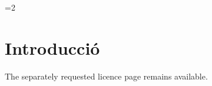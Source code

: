 \documentclass[CAT,TFG,no-cover,no-toc]{P3CTeX}
\begin{document}
\pxTFGlicencepage
\ifnum\value{page}=2\relax\else
\fi
\section{Introducció}
The separately requested licence page remains available.
\end{document}
